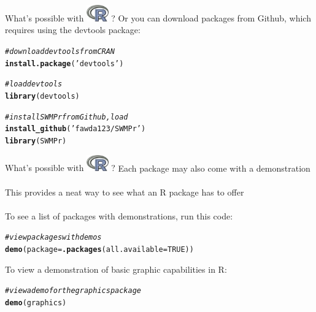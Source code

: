 \documentclass[xcolor=svgnames]{beamer}\usepackage[]{graphicx}\usepackage[]{color}
\makeatletter
\newcommand{\hlnum}[1]{\textcolor[rgb]{0.686,0.059,0.569}{#1}}%
\newcommand{\hlstr}[1]{\textcolor[rgb]{0.192,0.494,0.8}{#1}}%
\newcommand{\hlcom}[1]{\textcolor[rgb]{0.678,0.584,0.686}{\textit{#1}}}%
\newcommand{\hlstd}[1]{\textcolor[rgb]{0.345,0.345,0.345}{#1}}%
\newcommand{\hlkwc}[1]{\textcolor[rgb]{0.333,0.667,0.333}{#1}}%
\newcommand{\hlkwd}[1]{\textcolor[rgb]{0.737,0.353,0.396}{\textbf{#1}}}%
\newenvironment{kframe}{%
 \def\at@end@of@kframe{}%
 \ifinner\ifhmode%
  \def\at@end@of@kframe{\end{minipage}}%
  \begin{minipage}{\columnwidth}%
 \fi\fi%
 \def\FrameCommand##1{\hskip\@totalleftmargin \hskip-\fboxsep
 \colorbox{shadecolor}{##1}\hskip-\fboxsep
     \hskip-\linewidth \hskip-\@totalleftmargin \hskip\columnwidth}%
 \MakeFramed {\advance\hsize-\width
   \@totalleftmargin\z@ \linewidth\hsize
   \@setminipage}}%
 {\par\unskip\endMakeFramed%
 \at@end@of@kframe}
\newenvironment{knitrout}{}{} %
\makeatother
\begin{document}
\begin{frame}[t,fragile]{What's possible with \includegraphics[width=0.07\textwidth]{Rlogo.jpg} \hspace{0.2em}? }
Or you can download packages from Github, which requires using the devtools package:
\begin{knitrout}
\color{fgcolor}\begin{kframe}
\begin{alltt}
\hlcom{# download devtools from CRAN}
\hlkwd{install.package}\hlstd{(}\hlstr{'devtools'}\hlstd{)}

\hlcom{# load devtools}
\hlkwd{library}\hlstd{(devtools)}

\hlcom{# install SWMPr from Github, load}
\hlkwd{install_github}\hlstd{(}\hlstr{'fawda123/SWMPr'}\hlstd{)}
\hlkwd{library}\hlstd{(SWMPr)}
\end{alltt}
\end{kframe}
\end{knitrout}
\end{frame}

\begin{frame}[t,fragile]{What's possible with \includegraphics[width=0.07\textwidth]{Rlogo.jpg} \hspace{0.2em}? }
Each package may also come with a demonstration\\~\\
This provides a neat way to see what an R package has to offer\\~\\
To see a list of packages with demonstrations, run this code:
\begin{knitrout}
\color{fgcolor}\begin{kframe}
\begin{alltt}
\hlcom{# view packages with demos}
\hlkwd{demo}\hlstd{(}\hlkwc{package} \hlstd{=} \hlkwd{.packages}\hlstd{(}\hlkwc{all.available} \hlstd{=} \hlnum{TRUE}\hlstd{))}
\end{alltt}
\end{kframe}
\end{knitrout}
To view a demonstration of basic graphic capabilities in R:
\begin{knitrout}
\color{fgcolor}\begin{kframe}
\begin{alltt}
\hlcom{# view a demo for the graphics package}
\hlkwd{demo}\hlstd{(graphics)}
\end{alltt}
\end{kframe}
\end{knitrout}
\end{frame}
\end{document}

